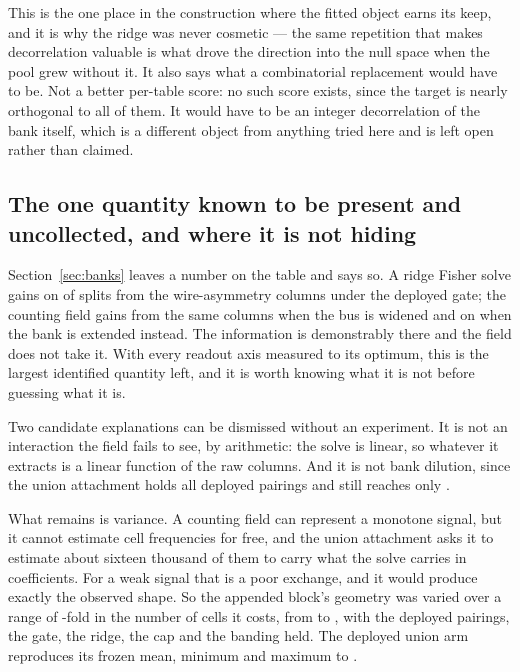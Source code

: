 \documentclass[11pt]{article}
\begin{document}
This is the one place in the construction where the fitted object earns its
keep, and it is why the ridge was never cosmetic --- the same repetition that
makes decorrelation valuable is what drove the direction into the null space when
the pool grew without it. It also says what a combinatorial replacement would have
to be. Not a better per-table score: no such score exists, since the target is
nearly orthogonal to all of them. It would have to be an integer decorrelation of
the bank itself, which is a different object from anything tried here and is left
open rather than claimed.

\subsection{The one quantity known to be present and uncollected, and where it is
not hiding}
\label{sec:appended}
Section~\ref{sec:banks} leaves a number on the table and says so. A ridge Fisher
solve gains \BlkFisher{} on \BlkFisherSplits{} of \LadderSplits{} splits from the
\BlkNewColumns{} wire-asymmetry columns under the deployed gate; the counting field
gains \CompWidened{} from the same columns when the bus is widened and
\BlkWTwoSixteen{} on \BlkWTwoSixteenSplits{} when the bank is extended instead. The
information is demonstrably there and the field does not take it. With every readout
axis measured to its optimum, this is the largest identified quantity left, and it
is worth knowing what it is not before guessing what it is.

Two candidate explanations can be dismissed without an experiment. It is not an
interaction the field fails to see, by arithmetic: the solve is linear, so whatever
it extracts is a linear function of the raw columns. And it is not bank dilution,
since the union attachment holds all \CompTablesFull{} deployed pairings and still
reaches only \BlkWTwoSixteen{}.

What remains is variance. A counting field can represent a monotone signal, but it
cannot estimate cell frequencies for free, and the union attachment asks it to
estimate about sixteen thousand of them to carry what the solve carries in
\BlkNewColumns{} coefficients. For a weak signal that is a poor exchange, and it
would produce exactly the observed shape. So the appended block's geometry was
varied over a range of \BlkCellsRatio{}-fold in the number of cells it costs, from
\BlkCellsMin{} to \BlkCellsMax{}, with the \CompTablesFull{} deployed pairings, the
gate, the ridge, the cap and the banding held. The deployed union arm reproduces its
frozen mean, minimum and maximum to \BlkRepro{}.
\end{document}
